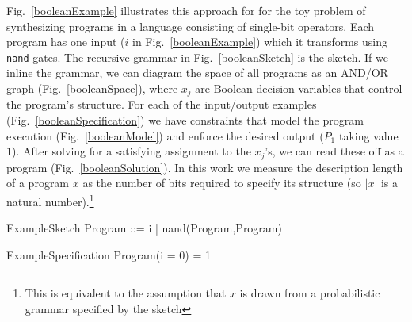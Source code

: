 \documentclass{article}
\begin{document}
Fig.~\ref{booleanExample} illustrates this approach for for the toy
problem of synthesizing programs in a language consisting of
single-bit operators.  Each program has one input ($i$ in
Fig.~\ref{booleanExample}) which it transforms using \verb|nand|
gates. The recursive grammar in Fig.~\ref{booleanSketch} is the
sketch. If we inline the grammar, we can diagram the space of all
programs as an AND/OR graph (Fig.~\ref{booleanSpace}), where $x_j$ are
Boolean decision variables that control the program's structure.  For
each of the input/output examples (Fig.~\ref{booleanSpecification}) we
have constraints that model the program execution
(Fig.~\ref{booleanModel}) and enforce the desired output ($P_1$ taking
value $1$). After solving for a satisfying assignment to the
$x_j$'s, we can read these off as a program
(Fig.~\ref{booleanSolution}).  In this work we measure the description
length of a program $x$ as the number of bits required to specify its
structure (so $|x|$ is a natural number).\footnote{This is equivalent
  to the assumption that $x$ is drawn from a probabilistic grammar
  specified by the sketch}


\begin{SaveVerbatim}[]{ExampleSketch}
Program ::= i
| nand(Program,Program)
\end{SaveVerbatim}
\begin{SaveVerbatim}[]{ExampleSpecification}
Program(i = 0) = 1
\end{SaveVerbatim}
\end{document}
